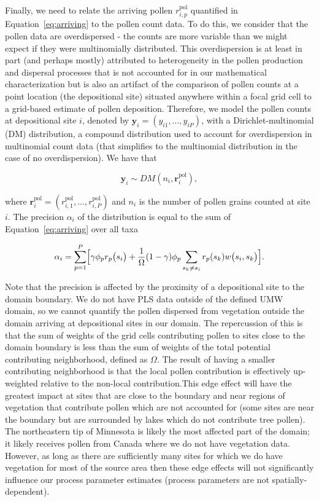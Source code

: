 \documentclass[12pt]{article}
\begin{document}
Finally, we need to relate the arriving pollen $r_{i,p}^{\text{pol}}$
quantified in Equation~\ref{eq:arriving} to the pollen count data. To
do this, we consider that the pollen data are overdispersed - the
counts are more variable than we might expect if they were
multinomially distributed. This overdispersion is at least in part
(and perhaps mostly) attributed to heterogeneity in the pollen
production and dispersal processes that is not accounted for in our
mathematical characterization but is also an artifact of the
comparison of pollen counts at a point location (the depositional
site) situated anywhere within a focal grid cell to a grid-based
estimate of pollen deposition. Therefore, we model the pollen counts
at depositional site $i$, denoted by $\bm{y}_i=(y_{i1}, \ldots,
y_{iP})$, with a Dirichlet-multinomial (DM) distribution, a compound
distribution used to account for overdispersion in multinomial count
data (that simplifies to the multinomial distribution in the case of
no overdispersion). We have that
\begin{linenomath*}
\begin{equation}
\bm{y}_i \sim DM (n_i, \bm{r}_i^{\text{pol}}),
\label{eq:DM}
\end{equation}
\end{linenomath*}
where $\bm{r}_i^{\text{pol}} = (r_{i,1}^{\text{pol}}, \ldots,
r_{i,P}^{\text{pol}})$ and $n_i$ is the number of pollen grains
counted at site $i$.  The precision $\alpha_i$ of the distribution is
equal to the sum of Equation~\ref{eq:arriving} over all taxa
\begin{linenomath*}
\begin{equation}
\alpha_i = \sum_{p=1}^P \Bigl[\gamma \phi_p r_p\bigl(s_i\bigr) + \frac{1}{\Omega} (1-\gamma) \phi_p \sum_{s_k \neq s_i } r_p(s_k) w\bigl(s_i, s_k\bigr)\Bigr].
\label{eq:alpha}
\end{equation}
\end{linenomath*}
Note that the precision is affected by the proximity of a depositional
site to the domain boundary. We do not have PLS data outside of the
defined UMW domain, so we cannot quantify the pollen dispersed from
vegetation outside the domain arriving at depositional sites in our
domain. The repercussion of this is that the sum of weights of the
grid cells contributing pollen to sites close to the domain boundary
is less than the sum of weights of the total potential contributing
neighborhood, defined as $\Omega$. The result of having a smaller
contributing neighborhood is that the local pollen contribution is
effectively up-weighted relative to the non-local contribution.This
edge effect will have the greatest impact at sites that are close to
the boundary and near regions of vegetation that contribute pollen
which are not accounted for (some sites are near the boundary but are
surrounded by lakes which do not contribute tree pollen). The
northeastern tip of Minnesota is likely the most affected part of the
domain; it likely receives pollen from Canada where we do not have
vegetation data. However, as long as there are sufficiently many sites
for which we do have vegetation for most of the source area then these
edge effects will not significantly influence our process parameter
estimates (process parameters are not spatially-dependent).
\end{document}
